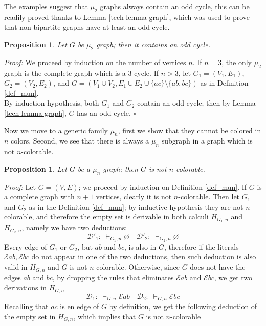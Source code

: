 \documentclass[a4paper,12pt,oneside]{book}
\newtheorem{proposition}[theorem]{Proposition}
\newcommand{\E}{\mathscr{E}}
\newcommand{\D}{\mathscr{D}}
\newcommand*{\QED}{\hfill\ensuremath{\square}}
\let\emptyset\varnothing
\begin{document}
\noindent The examples suggest that $\mu_2$ graphs always contain an odd cycle, this can be readily proved thanks to Lemma  \ref{tech-lemma-graph}, which was used to prove that  non bipartite graphs have at least an odd cycle.
\begin{proposition}\label{contains-odd}
Let $G$ be $\mu_2$ graph; then it contains an odd cycle.
\end{proposition}

\textit{Proof:} 
We proceed by induction on the number of vertices $n$. If $n=3$, the only $\mu_2$ graph is the complete graph which is a 3-cycle. If $n>3$, let $G_1=(V_1,E_1)$, $G_2=(V_2,E_2)$, and $G=(V_1\cup V_2, E_1\cup E_2\cup\{ac\} \setminus\{ab,bc\} )$ as in Definition \ref{def_mun}. 
\\By induction hypothesis, both $G_1$ and $G_2$ contain an odd cycle; then by Lemma \ref{tech-lemma-graph}, $G$ has an odd cycle. \QED


\noindent 
Now we move to a generic family $\mu_n$, first we show that they cannot be colored in $n$ colors. Second, we see that there is always a $\mu_n$ subgraph in a graph which is not $n$-colorable.
\begin{proposition}\label{pr-nocolor}
Let $G$ be a $\mu_n$ graph; then $G$ is not $n$-colorable.
\end{proposition}
\textit{Proof:} 
Let $G=(V,E)$; we proceed by induction on Definition \ref{def_mun}. If $G$ is a complete graph with $n+1$ vertices, clearly it is not $n$-colorable. Then let $G_1$ and $G_2$ as in the Definition \ref{def_mun}; by inductive hypothesis they are not  $n$-colorable, and therefore the empty set is derivable in both calculi $H_{G_1,n}$ and $H_{G_2,n}$, namely we have two deductions:
$$
 \D'_1:\; \vdash_{G_1,n} \emptyset  \quad \D'_2:\; \vdash_{G_2,n} \emptyset
$$
Every edge of $G_1$ or $G_2$, but $ab$ and $bc$, is also in $G$, therefore if the literals $\E ab, \E bc$ do not appear in one of the two deductions, then such deduction is also valid in $H_{G,n}$ and $G$ is not $n$-colorable.
Otherwise, since $G$ does not have the edges $ab$ and $bc$, by dropping the rules that eliminates $\E ab$ and $\E bc$, we get two derivations in $H_{G,n}$
$$
 \D_1:\; \vdash_{G,n} \E ab  \quad \D_2:\; \vdash_{G,n} \E bc 
$$
Recalling that $ac$ is en edge of $G$ by definition, we get the following deduction of the empty set in $H_{G,n}$, which implies that $G$ is not $n$-colorable

\end{document}
